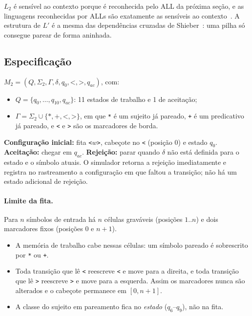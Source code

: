 \documentclass[11pt,a4paper]{article}
\newcommand{\cad}[1]{\texttt{#1}}       %
\newcommand{\Ldois}{L_2}
\begin{document}
$\Ldois$ é sensível ao contexto porque é reconhecida pelo ALL da próxima seção, e as linguagens reconhecidas por ALLs são exatamente as sensíveis ao contexto~\cite{kuroda}. A estrutura de $L'$ é a mesma das dependências cruzadas de Shieber~\cite{shieber}: uma pilha só consegue parear de forma aninhada.

\subsection{Especificação}

$M_2=(Q,\Sigma_2,\Gamma,\delta,q_0,\cad{<},\cad{>},q_{ac})$, com:
\begin{itemize}
  \item $Q=\{q_0,\dots,q_{10},q_{ac}\}$: 11 estados de trabalho e 1 de aceitação;
  \item $\Gamma=\Sigma_2\cup\{\cad{*},\cad{+},\cad{<},\cad{>}\}$, em que \cad{*} é um sujeito já pareado, \cad{+} é um predicativo já pareado, e \cad{<} e \cad{>} são os marcadores de borda.
\end{itemize}

\textbf{Configuração inicial:} fita \cad{<}$w$\cad{>}, cabeçote no \cad{<} (posição 0) e estado $q_0$.
\textbf{Aceitação:} chegar em $q_{ac}$. \textbf{Rejeição:} parar quando $\delta$ não está definida para o estado e o símbolo atuais. O simulador retorna a rejeição imediatamente e registra no rastreamento a configuração em que faltou a transição; não há um estado adicional de rejeição.

\paragraph{Limite da fita.} Para $n$ símbolos de entrada há $n$ células graváveis (posições $1..n$) e dois marcadores fixos (posições $0$ e $n+1$).
\begin{itemize}
  \item A memória de trabalho cabe nessas células: um símbolo pareado é sobrescrito por \cad{*} ou \cad{+}.
  \item Toda transição que lê \cad{<} reescreve \cad{<} e move para a direita, e toda transição que lê \cad{>} reescreve \cad{>} e move para a esquerda. Assim os marcadores nunca são alterados e o cabeçote permanece em $[0,n+1]$.
  \item A classe do sujeito em pareamento fica no \emph{estado} ($q_6$--$q_9$), não na fita.
\end{itemize}
\end{document}
